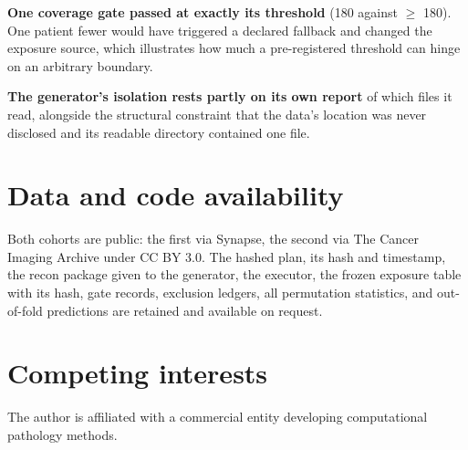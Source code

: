 \documentclass[11pt,a4paper]{article}
\begin{document}
\textbf{One coverage gate passed at exactly its threshold} (180 against $\geq$ 180). One patient
fewer would have triggered a declared fallback and changed the exposure source, which illustrates
how much a pre-registered threshold can hinge on an arbitrary boundary.

\textbf{The generator's isolation rests partly on its own report} of which files it read, alongside
the structural constraint that the data's location was never disclosed and its readable directory
contained one file.

\section*{Data and code availability}

Both cohorts are public: the first via Synapse, the second via The Cancer Imaging Archive under
CC BY 3.0. The hashed plan, its hash and timestamp, the recon package given to the generator, the
executor, the frozen exposure table with its hash, gate records, exclusion ledgers, all permutation
statistics, and out-of-fold predictions are retained and available on request.

\section*{Competing interests}

The author is affiliated with a commercial entity developing computational pathology methods.
\end{document}
